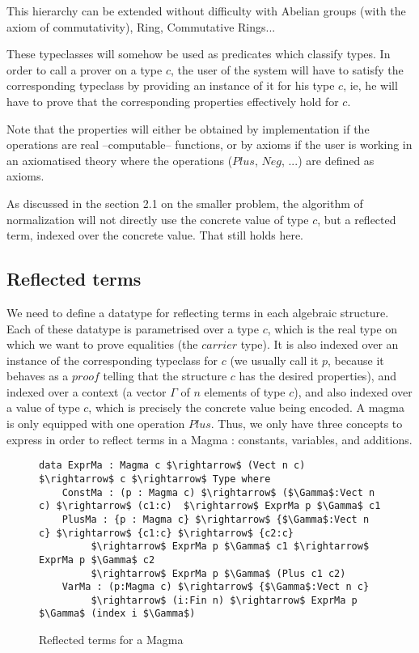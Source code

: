 This hierarchy can be extended without difficulty with Abelian groups (with the axiom of commutativity), Ring, Commutative Rings...

These typeclasses will somehow be used as predicates which classify types. In order to call a prover on a type $c$, the user of the system will have to satisfy the corresponding typeclass by providing an instance of it for his type $c$, ie, he will have to prove that the corresponding properties effectively hold for $c$.

Note that the properties will either be obtained by implementation if the operations are real --computable-- functions, or by axioms if the user is working in an axiomatised theory where the operations ($Plus$, $Neg$, ...) are defined as axioms.

As discussed in the section 2.1 on the smaller problem, the algorithm of normalization will not directly use the concrete value of type $c$, but a reflected term, indexed over the concrete value. That still holds here.


	\subsection {Reflected terms}

We need to define a datatype for reflecting terms in each algebraic structure.
Each of these datatype is parametrised over a type $c$, which is the real type on which we want to prove equalities (the $carrier$ type). It is also indexed over an instance of the corresponding typeclass for $c$ (we usually call it $p$, because it behaves as a $proof$ telling that the structure $c$ has the desired properties), and indexed over a context (a vector $\Gamma$ of $n$ elements of type $c$), and also indexed over a value of type $c$, which is precisely the concrete value being encoded.
A magma is only equipped with one operation $Plus$. Thus, we only have three concepts to express in order to reflect terms in a Magma : constants, variables, and additions.



\begin{figure}[H]
\figrule
\begin{center}
\begin{lstlisting}
data ExprMa : Magma c $\rightarrow$ (Vect n c) $\rightarrow$ c $\rightarrow$ Type where
    ConstMa : (p : Magma c) $\rightarrow$ ($\Gamma$:Vect n c) $\rightarrow$ (c1:c)  $\rightarrow$ ExprMa p $\Gamma$ c1 
    PlusMa : {p : Magma c} $\rightarrow$ {$\Gamma$:Vect n c} $\rightarrow$ {c1:c} $\rightarrow$ {c2:c} 
         $\rightarrow$ ExprMa p $\Gamma$ c1 $\rightarrow$ ExprMa p $\Gamma$ c2 
         $\rightarrow$ ExprMa p $\Gamma$ (Plus c1 c2) 
    VarMa : (p:Magma c) $\rightarrow$ {$\Gamma$:Vect n c}
         $\rightarrow$ (i:Fin n) $\rightarrow$ ExprMa p $\Gamma$ (index i $\Gamma$)
\end{lstlisting}
\end{center}
\caption{Reflected terms for a Magma}
\label{ExprMa}
\figrule
\end{figure}

